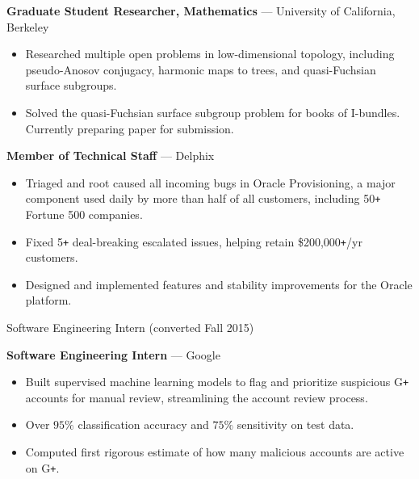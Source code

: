 \documentclass[10pt,letterpaper]{article}
\newcommand{\archive}[1]{}
\newcommand{\dates}[1]{\item[#1\hfill]}
\newcommand{\jobhead}[3]{{\dates{#1}{\bf #3} --- {#2}}}
\newenvironment{jobs}
  {\leftmargini=24.1mm%
   \begin{list}%
    {}
    {\setlength\labelwidth{22mm}\itemsep=1.5mm}}
  {\end{list}}
\begin{document}
\begin{jobs}


\jobhead{2013\,--\,2017} {University of California, Berkeley}{Graduate Student
Researcher, Mathematics} \begin{itemize}

\item Researched multiple open problems in low-dimensional topology, including
pseudo-Anosov conjugacy, harmonic maps to trees, and quasi-Fuchsian surface
subgroups.

\item Solved the quasi-Fuchsian surface subgroup problem for books of
I-bundles. Currently preparing paper for submission.

\end{itemize}
\jobhead{2015\,--\,2016}
{Delphix}{Member of Technical Staff}
\begin{itemize}

\item Triaged and root caused all incoming bugs in Oracle Provisioning,
a major component used daily by more than half of all customers,
including 50\verb!+! Fortune 500 companies.

\item Fixed 5\verb!+! deal-breaking escalated issues, helping
retain \$200,000\verb!+!/yr customers.

\item Designed and implemented features and
stability improvements for the Oracle platform.

\end{itemize}
\vspace{-2mm}
\dates{2015}
Software Engineering Intern (converted Fall 2015)

\archive{
\item Implemented a new data management feature across multiple Delphix
data platforms.
}

\jobhead{2014}
{Google}{Software Engineering Intern}
\begin{itemize}

\item Built supervised machine learning models to flag and prioritize
suspicious G\verb!+!  accounts for manual review, streamlining the account
review process.

\item Over $95\%$ classification accuracy and $75\%$ sensitivity on
test data.

\item Computed first rigorous estimate of how many malicious accounts are
active on G\verb!+!.


\end{itemize}
\end{jobs}
\end{document}
